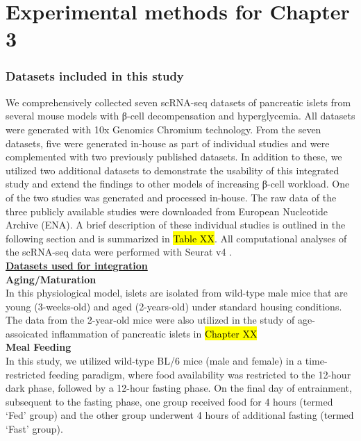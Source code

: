 \clearpage

\section{Experimental methods for Chapter 3}
\label{sec:chp4_methods2}

\subsubsection{\large Datasets included in this study}

We comprehensively collected seven scRNA-seq datasets of pancreatic islets from several mouse models with β-cell decompensation and hyperglycemia. All datasets were generated with 10x Genomics Chromium technology. From the seven datasets, five were generated in-house as part of individual studies and were complemented  with two previously published datasets. In addition to these, we utilized two additional datasets to demonstrate the usability of this integrated study and extend the findings to other models of increasing β-cell workload. One of the two studies was generated and processed in-house. The raw data of the three publicly available studies were downloaded from European Nucleotide Archive (ENA). A brief description of these individual studies is outlined in the following section and is summarized in \hl{Table XX}. All computational analyses of the scRNA-seq data were performed with Seurat v4 \textbf{\cite{hao_integrated_2021}}.\\


\underline{\normalsize \textbf{Datasets used for integration}}\\


\textbf{Aging/Maturation\\}
In this physiological model, islets are isolated from wild-type male mice that are young (3-weeks-old) and aged (2-years-old) under standard housing conditions. The data from the 2-year-old mice were also utilized in the study of age-assoicated inflammation of pancreatic islets in \hl{Chapter XX}\\

\textbf{Meal Feeding\\}
In this study, we utilized wild-type BL/6 mice (male and female) in a time-restricted feeding paradigm, where food availability was restricted to the 12-hour dark phase, followed by a 12-hour fasting phase. On the final day of entrainment, subsequent to the fasting phase, one group received food for 4 hours (termed ‘Fed’ group) and the other group underwent 4 hours of additional fasting (termed ‘Fast’ group).\\

